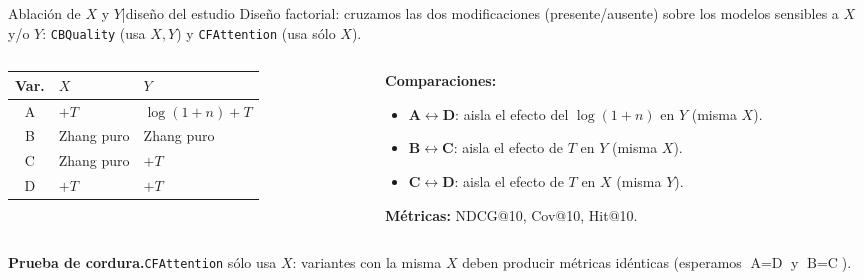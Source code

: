 \documentclass[aspectratio=169,11pt]{beamer}
\begin{document}
\begin{frame}{Ablaci\'on de $X$ y $Y$\;|\;dise\~no del estudio}
	\small
	Dise\~no factorial: cruzamos las dos modificaciones (presente/ausente) sobre
	los modelos sensibles a $X$ y/o $Y$: \texttt{CBQuality} (usa $X,Y$) y
	\texttt{CFAttention} (usa s\'olo $X$).

	\vspace{0.4em}
	\begin{columns}[T]
		\begin{column}{0.55\linewidth}
			\centering
			\scriptsize
			\renewcommand{\arraystretch}{1.15}
			\setlength{\tabcolsep}{4pt}
			\begin{tabular}{c l l}
				\toprule
				\textbf{Var.} & \textbf{$X$} & \textbf{$Y$}  \\
				\midrule
				A             & $+T$         & $\log(1+n)+T$ \\
				B             & Zhang puro   & Zhang puro    \\
				C             & Zhang puro   & $+T$          \\
				D             & $+T$         & $+T$          \\
				\bottomrule
			\end{tabular}
		\end{column}
		\begin{column}{0.43\linewidth}
			\textbf{Comparaciones:}
			\begin{itemize}\setlength\itemsep{2pt}
				\item $\mathbf{A}\leftrightarrow\mathbf{D}$: aisla el efecto del $\log(1+n)$ en $Y$ (misma $X$).
				\item $\mathbf{B}\leftrightarrow\mathbf{C}$: aisla el efecto de $T$ en $Y$ (misma $X$).
				\item $\mathbf{C}\leftrightarrow\mathbf{D}$: aisla el efecto de $T$ en $X$ (misma $Y$).
			\end{itemize}
			\vspace{0.4em}
			\textbf{M\'etricas:} NDCG@10, Cov@10, Hit@10.
		\end{column}
	\end{columns}

	\vspace{0.5em}
	\textbf{Prueba de cordura.}\;\texttt{CFAttention} s\'olo usa $X$: variantes con
	la misma $X$ deben producir m\'etricas id\'enticas (esperamos $\text{A}{=}\text{D}$
	y $\text{B}{=}\text{C}$).
\end{frame}
\end{document}
